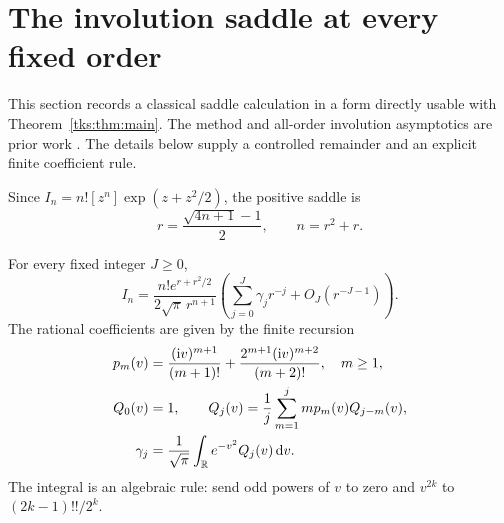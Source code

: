 \section{The involution saddle at every fixed order}\label{tks:sec:involutions}
This section records a classical saddle calculation in a form directly usable with Theorem~\ref{tks:thm:main}. The method and all-order involution asymptotics are prior work \cite{MW1955,MW1956}. The details below supply a controlled remainder and an explicit finite coefficient rule.

Since $I_n=n![z^n]\exp(z+z^2/2)$, the positive saddle is
\begin{equation}\label{tks:eq:saddle}
r=\frac{\sqrt{4n+1}-1}{2},\qquad n=r^2+r.
\end{equation}
\begin{proposition}\label{tks:prop:saddle}
For every fixed integer $J\geq0$,
\begin{equation}\label{tks:eq:saddleexpansion}
I_n=\frac{n!e^{r+r^2/2}}{2\sqrt\pi\,r^{n+1}}
 \left(\sum_{j=0}^{J}\gamma_jr^{-j}+O_J(r^{-J-1})\right).
\end{equation}
The rational coefficients are given by the finite recursion
\begin{align}
p_m(v)&=\frac{(\mathrm i v)^{m+1}}{(m+1)!}
            +\frac{2^{m+1}(\mathrm i v)^{m+2}}{(m+2)!},\quad m\geq1,\notag\\
Q_0(v)&=1,\qquad
Q_j(v)=\frac1j\sum_{m=1}^j mp_m(v)Q_{j-m}(v),\label{tks:eq:saddlerec}\\
\gamma_j&=\frac1{\sqrt\pi}\int_{\mathbb R}e^{-v^2}Q_j(v)\,\mathrm d v.\notag
\end{align}
The integral is an algebraic rule: send odd powers of $v$ to zero and $v^{2k}$ to $(2k-1)!!/2^k$.
\end{proposition}
